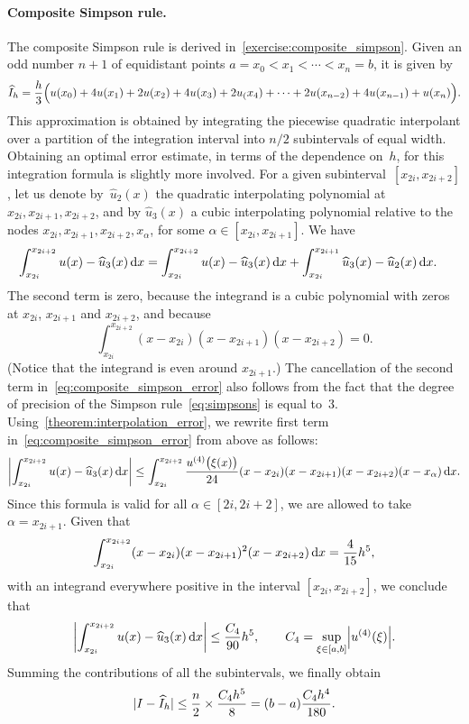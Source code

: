 \paragraph{Composite Simpson rule.}
The composite Simpson rule is derived in~\cref{exercise:composite_simpson}.
Given an odd number $n+1$ of equidistant points $a = x_0 < x_1 < \dotsb < x_n = b$,
it is given by
\begin{equation}
    \label{eq:composite_simpson}
    \widehat I_h = \frac{h}{3} \Bigl( u(x_0) + 4 u(x_1) + 2 u(x_2) + 4 u(x_3) + 2 u_(x_4) + \dotsb + 2 u(x_{n-2}) + 4 u(x_{n-1}) + u(x_n)\Bigr).
\end{equation}
This approximation is obtained by integrating the piecewise quadratic interpolant
over a partition of the integration interval into $n/2$ subintervals of equal width.
Obtaining an optimal error estimate,
in terms of the dependence on~$h$,
for this integration formula is slightly more involved.
For a given subinterval~$[x_{2i}, x_{2i+2}]$,
let us denote by~$\widehat u_2(x)$ the quadratic interpolating polynomial at $x_{2i}, x_{2i+1}, x_{2i+2}$,
and by $\widehat u_3(x)$ a cubic interpolating polynomial relative to the nodes $x_{2i}, x_{2i+1}, x_{2i+2}, x_{\alpha}$,
for some $\alpha \in [x_{2i}, x_{2i+1}]$.
We have
\begin{align}
    \label{eq:composite_simpson_error}
    \int_{x_{2i}}^{x_{2i+2}} u(x) - \widehat u_3(x) \, \d x
    &= \int_{x_{2i}}^{x_{2i+2}} u(x) - \widehat u_3(x)  \, \d x + \int_{x_{2i}}^{x_{2i+1}} \widehat u_3(x) - \widehat u_2(x)  \, \d x.
\end{align}
The second term is zero,
because the integrand is a cubic polynomial with zeros at $x_{2i}$, $x_{2i+1}$ and $x_{2i+2}$,
and because
\[
    \int_{x_{2i}}^{x_{2i+2}} (x - x_{2i}) (x - x_{2i+1}) (x - x_{2i+2}) = 0.
\]
(Notice that the integrand is even around $x_{2i+1}$.)
The cancellation of the second term in~\eqref{eq:composite_simpson_error} also follows from the fact that
the degree of precision of the Simpson rule~\eqref{eq:simpsons} is equal to~3.
Using~\cref{theorem:interpolation_error},
we rewrite first term in~\eqref{eq:composite_simpson_error} from above as follows:
\[
    \abs*{\int_{x_{2i}}^{x_{2i+2}} u(x) - \widehat u_3(x)  \, \d x}
    \leq \int_{x_{2i}}^{x_{2i+2}} \frac{u^{(4)} \bigl(\xi(x)\bigr)}{24} (x-x_{2i})(x- x_{2i+1}) (x-x_{2i+2}) (x - x_{\alpha})\, \d x.
\]
Since this formula is valid for all $\alpha \in [2i, 2i+2]$,
we are allowed to take $\alpha = x_{2i+1}$.
Given that
\[
    \int_{x_{2i}}^{x_{2i+2}} (x-x_{2i})(x- x_{2i+1})^2 (x-x_{2i+2}) \, \d x = \frac{4}{15} h^5,
\]
with an integrand everywhere positive in the interval $[x_{2i}, x_{2i+2}]$,
we conclude that
\[
    \abs*{\int_{x_{2i}}^{x_{2i+2}} u(x) - \widehat u_3(x)  \, \d x} \leq \frac{C_4}{90} h^5,
    \qquad C_4 = \sup_{\xi \in [a, b]} \abs*{u^{(4)}(\xi)}.
\]
Summing the contributions of all the subintervals, 
we finally obtain
\begin{equation}
    \abs{I - \widehat I_h} \leq  \frac{n}{2} \times \frac{C_4 h^5}{8} = (b-a)\frac{C_4 h^4}{180}.
\end{equation}

